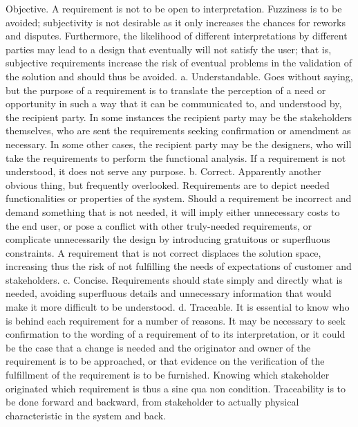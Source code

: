 Objective. A requirement is not to be open to interpretation. Fuzziness is to be avoided; subjectivity is not desirable as it only increases the chances for reworks and disputes. Furthermore, the likelihood of different interpretations by different parties may lead to a design that eventually will not satisfy the user; that is, subjective requirements increase the risk of eventual problems in the validation of the solution and should thus be avoided.
    a. Understandable. Goes without saying, but the purpose of a requirement is to translate the perception of a need or opportunity in such a way that it can be communicated to, and understood by, the recipient party. In some instances the recipient party may be the stakeholders themselves, who are sent the requirements seeking confirmation or amendment as necessary. In some other cases, the recipient party may be the designers, who will take the requirements to perform the functional analysis. If a requirement is not understood, it does not serve any purpose.
    b. Correct. Apparently another obvious thing, but frequently overlooked. Requirements are to depict needed functionalities or properties of the system. Should a requirement be incorrect and demand something that is not needed, it will imply either unnecessary costs to the end user, or pose a conflict with other truly-needed requirements, or complicate unnecessarily the design by introducing gratuitous or superfluous constraints. A requirement that is not correct displaces the solution space, increasing thus the risk of not fulfilling the needs of expectations of customer and stakeholders.
    c. Concise. Requirements should state simply and directly what is needed, avoiding superfluous details and unnecessary information that would make it more difficult to be understood.
    d. Traceable. It is essential to know who is behind each requirement for a number of reasons. It may be necessary to seek confirmation to the wording of a requirement of to its interpretation, or it could be the case that a change is needed and the originator and owner of the requirement is to be approached, or that evidence on the verification of the fulfillment of the requirement is to be furnished. Knowing which stakeholder originated which requirement is thus a sine qua non condition. Traceability is to be done forward and backward, from stakeholder to actually physical characteristic in the system and back.
